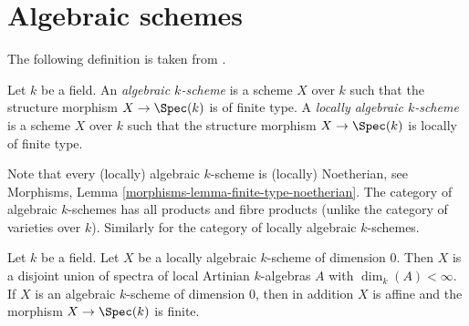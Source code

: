\section{Algebraic schemes}
\label{section-algebraic-schemes}

\noindent
The following definition is taken from
\cite[I Definition 6.4.1]{EGA}.

\begin{definition}
\label{definition-algebraic-scheme}
Let $k$ be a field. An {\it algebraic $k$-scheme} is a scheme $X$ over $k$
such that the structure morphism $X \to \Spec(k)$ is of
finite type. A {\it locally algebraic $k$-scheme} is a scheme $X$ over $k$
such that the structure morphism $X \to \Spec(k)$ is
locally of finite type.
\end{definition}

\noindent
Note that every (locally) algebraic $k$-scheme is (locally) Noetherian, see
Morphisms, Lemma \ref{morphisms-lemma-finite-type-noetherian}.
The category of algebraic $k$-schemes has all products and fibre products
(unlike the category of varieties over $k$). Similarly for the category
of locally algebraic $k$-schemes.

\begin{lemma}
\label{lemma-algebraic-scheme-dim-0}
Let $k$ be a field. Let $X$ be a locally algebraic $k$-scheme of
dimension $0$. Then $X$ is a disjoint union of spectra of local Artinian
$k$-algebras $A$ with $\dim_k(A) < \infty$. If $X$ is an algebraic $k$-scheme
of dimension $0$, then in addition $X$ is affine and the morphism
$X \to \Spec(k)$ is finite.
\end{lemma}

